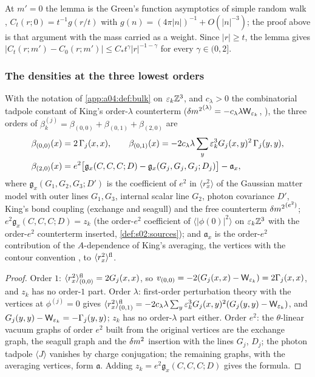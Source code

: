 At $m'=0$ the lemma is the Green's function asymptotics of simple random walk \cite[Thm.~4.3.1]{LL10}, $C_t(r;0)=t^{-1}g(r/t)$ with $g(n)=(4\pi|n|)^{-1}+O(|n|^{-3})$; the proof above is that argument with the mass carried as a weight. Since $|r|\ge t$, the lemma gives $|C_t(r;m')-C_0(r;m')|\le C_*t^{\gamma}|r|^{-1-\gamma}$ for every $\gamma\in(0,2]$.

\subsubsection{The densities at the three lowest orders}

\begin{lemma}[the bulk density at $A=0$]\label{app:a04:lem:bulkform}
With the notation of \cref{app:a04:def:bulk} on $\varepsilon_k\mathbb Z^3$, and $c_\lambda>0$ the combinatorial tadpole constant of King's order-$\lambda$ counterterm (${\delta m^2}^{(\lambda)}=-c_\lambda\lambda\mathsf W_{\varepsilon_k}$, \cite[(3.33)]{K1}), the three orders of $\beta^{(j)}_k=\beta_{(0,0)}+\beta_{(0,1)}+\beta_{(2,0)}$ are
\begin{align*}
\beta_{(0,0)}(x)&=2\,\Gamma_j(x,x),\qquad
\beta_{(0,1)}(x)=-2c_\lambda\lambda\sum_y\varepsilon_k^3G_j(x,y)^2\,\Gamma_j(y,y),\\
\beta_{(2,0)}(x)&=e^2\big[\mathfrak g_x(C,C,C;D)-\mathfrak g_x(G_j,G_j,G_j;D_j)\big]-\mathfrak a_x,
\end{align*}
where $\mathfrak g_x(G_1,G_2,G_3;D')$ is the coefficient of $e^2$ in $\langle r_x^2\rangle$ of the Gaussian matter model with outer lines $G_1,G_3$, internal scalar line $G_2$, photon covariance $D'$, King's bond coupling (exchange and seagull) and the free counterterm ${\delta m^2}^{(e^2)}$; $e^2\mathfrak g_x(C,C,C;D)=z_k$ (the order-$e^2$ coefficient of $\langle|\phi(0)|^2\rangle$ on $\varepsilon_k\mathbb Z^3$ with the order-$e^2$ counterterm inserted, \cref{def:s02:sources}); and $\mathfrak a_x$ is the order-$e^2$ contribution of the $A$-dependence of King's averaging, the vertices \cite[(3.24)--(3.26)]{K1} with the contour convention \cite[(2.19), (3.27)]{K1}, to $\langle r_x^2\rangle^{\mathrm{fl}}$.
\end{lemma}
\begin{proof}
Order $1$: $\langle r_x^2\rangle^{\mathrm{fl}}_{(0,0)}=2G_j(x,x)$, so $v_{(0,0)}=-2(G_j(x,x)-\mathsf W_{\varepsilon_k})=2\Gamma_j(x,x)$, and $z_k$ has no order-$1$ part. Order $\lambda$: first-order perturbation theory with the vertices \cite[(3.18)--(3.19)]{K1} at $\phi^{(j)}=0$ gives $\langle r^2_x\rangle^{\mathrm{fl}}_{(0,1)}=-2c_\lambda\lambda\sum_y\varepsilon_k^3G_j(x,y)^2(G_j(y,y)-\mathsf W_{\varepsilon_k})$, and $G_j(y,y)-\mathsf W_{\varepsilon_k}=-\Gamma_j(y,y)$; $z_k$ has no order-$\lambda$ part either. Order $e^2$: the $\theta$-linear vacuum graphs of order $e^2$ built from the original vertices are the exchange graph, the seagull graph and the $\delta m^2$ insertion with the lines $G_j$, $D_j$; the photon tadpole $\langle J\rangle$ vanishes by charge conjugation; the remaining graphs, with the averaging vertices, form $\mathfrak a$. Adding $z_k=e^2\mathfrak g_x(C,C,C;D)$ gives the formula.
\end{proof}

